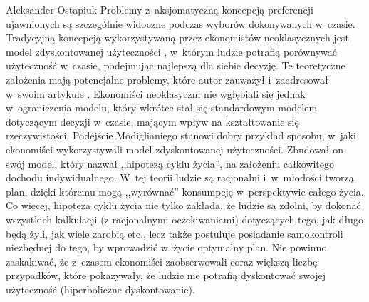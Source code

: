 \begin{artplenv}{Aleksander Ostapiuk}
Problemy z~aksjomatyczną koncepcją preferencji ujawnionych są szczególnie widoczne podczas wyborów
dokonywanych w~czasie. Tradycyjną koncepcją wykorzystywaną przez ekonomistów neoklasycznych jest model zdyskontowanej użyteczności
\parencite{samuelson_note_1937},
w~którym ludzie potrafią porównywać użyteczność w~czasie, podejmując
najlepszą dla siebie decyzję. Te teoretyczne założenia mają potencjalne problemy, które autor
zauważył i~zaadresował w~swoim artykule
\parencite{samuelson_note_1937}.
Ekonomiści neoklasyczni nie wgłębiali się jednak w~ograniczenia modelu,
który wkrótce stał się standardowym modelem dotyczącym decyzji w~czasie, mającym wpływ na
kształtowanie się rzeczywistości. Podejście Modiglianiego
\parencite*{modigliani_life_1966}
stanowi dobry przykład sposobu, w~jaki
ekonomiści wykorzystywali model zdyskontowanej użyteczności. Zbudował on swój model, który nazwał
,,hipotezą cyklu życia'', na założeniu całkowitego dochodu indywidualnego. W~tej teorii ludzie są racjonalni i~w~młodości tworzą
plan, dzięki któremu mogą ,,wyrównać'' konsumpcję w~perspektywie całego życia. Co więcej, hipoteza cyklu życia nie tylko
zakłada, że ludzie są zdolni, by dokonać wszystkich kalkulacji (z racjonalnymi oczekiwaniami) dotyczących tego, jak
długo będą żyli, jak wiele zarobią etc., lecz także postuluje posiadanie samokontroli niezbędnej do tego, by
wprowadzić w~życie optymalny plan. Nie powinno zaskakiwać, że z~czasem ekonomiści zaobserwowali coraz większą liczbę
przypadków, które pokazywały, że ludzie nie potrafią dyskontować swojej użyteczność (hiperboliczne dyskontowanie).

\enlargethispage{.5\baselineskip}


\end{artplenv}
